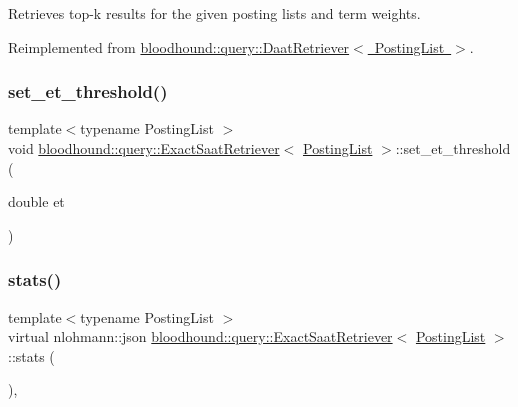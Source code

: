 Retrieves top-\/k results for the given posting lists and term weights. 



Reimplemented from \mbox{\hyperlink{classbloodhound_1_1query_1_1DaatRetriever_ab80b4867fc263827dc2fdbe0965a2e8c}{bloodhound\+::query\+::\+Daat\+Retriever$<$ Posting\+List $>$}}.

\mbox{\label{classbloodhound_1_1query_1_1ExactSaatRetriever_a78016cfffe921ed440dec62c6f82f4cc}} 
\subsubsection{\texorpdfstring{set\+\_\+et\+\_\+threshold()}{set\_et\_threshold()}}
{\footnotesize\ttfamily template$<$typename Posting\+List $>$ \\
void \mbox{\hyperlink{classbloodhound_1_1query_1_1ExactSaatRetriever}{bloodhound\+::query\+::\+Exact\+Saat\+Retriever}}$<$ \mbox{\hyperlink{classbloodhound_1_1PostingList}{Posting\+List}} $>$\+::set\+\_\+et\+\_\+threshold (\begin{DoxyParamCaption}\item[{double}]{et }\end{DoxyParamCaption})\hspace{0.3cm}{\ttfamily [inline]}}

\mbox{\label{classbloodhound_1_1query_1_1ExactSaatRetriever_a716838f463f124964e76f48bc37d32cc}} 
\subsubsection{\texorpdfstring{stats()}{stats()}}
{\footnotesize\ttfamily template$<$typename Posting\+List $>$ \\
virtual nlohmann\+::json \mbox{\hyperlink{classbloodhound_1_1query_1_1ExactSaatRetriever}{bloodhound\+::query\+::\+Exact\+Saat\+Retriever}}$<$ \mbox{\hyperlink{classbloodhound_1_1PostingList}{Posting\+List}} $>$\+::stats (\begin{DoxyParamCaption}{ }\end{DoxyParamCaption})\hspace{0.3cm}{\ttfamily [inline]}, {\ttfamily [virtual]}}



